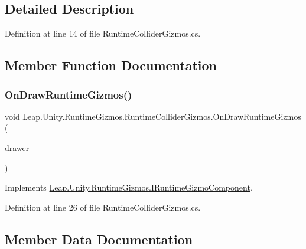 \subsection{Detailed Description}


Definition at line 14 of file Runtime\+Collider\+Gizmos.\+cs.



\subsection{Member Function Documentation}
\mbox{\label{class_leap_1_1_unity_1_1_runtime_gizmos_1_1_runtime_collider_gizmos_af781c99e4d3b838bfc69d5733071a936}} 
\subsubsection{\texorpdfstring{OnDrawRuntimeGizmos()}{OnDrawRuntimeGizmos()}}
{\footnotesize\ttfamily void Leap.\+Unity.\+Runtime\+Gizmos.\+Runtime\+Collider\+Gizmos.\+On\+Draw\+Runtime\+Gizmos (\begin{DoxyParamCaption}\item[{\mbox{\hyperlink{class_leap_1_1_unity_1_1_runtime_gizmos_1_1_runtime_gizmo_drawer}{Runtime\+Gizmo\+Drawer}}}]{drawer }\end{DoxyParamCaption})}



Implements \mbox{\hyperlink{interface_leap_1_1_unity_1_1_runtime_gizmos_1_1_i_runtime_gizmo_component_abaa7cf174480d957b48d0023df50291d}{Leap.\+Unity.\+Runtime\+Gizmos.\+I\+Runtime\+Gizmo\+Component}}.



Definition at line 26 of file Runtime\+Collider\+Gizmos.\+cs.



\subsection{Member Data Documentation}
\mbox{\label{class_leap_1_1_unity_1_1_runtime_gizmos_1_1_runtime_collider_gizmos_af068a98b25808761c0bb2d060dae4fdd}} 
